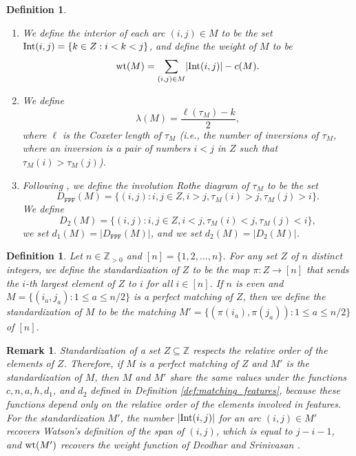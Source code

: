 \documentclass[10pt,a4paper]{amsart}
\newtheorem{defn}[theorem]{Definition}
\newtheorem{rmk}[theorem]{Remark}
\numberwithin{equation}{section}
\newcommand{\Z}{{\mathbb Z}}
\newcommand{\ra}{\rightarrow}
\DeclareMathOperator{\wt}{\rm{wt}}
\DeclareMathOperator{\interior}{\rm{Int}}
\newcommand{\se}{\subseteq}
\newcommand{\abs}[1]{\lvert #1 \rvert}
\begin{document}
\begin{defn}
\begin{enumerate}
\item We define the \emph{interior} of each arc $(i,j)\in M$ to be the set 
  $\interior(i,j)=\{k\in Z: i<k<j\}$, and define the \emph{weight} of $M$ to be
  \begin{equation} \label{eq:wt} 
    \wt(M)=\sum_{(i,j)\in M} \abs{\interior(i,j)}-c(M).
  \end{equation}

\item We define 
  \[
    \lambda(M)=\frac{\ell(\tau_M)-k}{2},
  \]
  where $\ell$ is the Coxeter length of $\tau_M$ (i.e., the number of inversions
  of $\tau_M$, where an inversion is a pair of numbers $i<j$ in $Z$ such that
  $\tau_M(i)>\tau_M(j)$). 
  

\item Following \cite{hamaker18}, we define
  the \emph{involution Rothe diagram} of $\tau_M$ to be
  the set
  \[
    D_\texttt{FPF}(M)=\{(i,j) : i,j\in Z, i>j, \tau_M(i)>j, \tau_M(j)>i\}.
  \]
  We define 
  \[ 
  D_2(M)=\{(i,j) : i,j\in Z, i<j, \tau_M(i)<j, \tau_M(j)<i\},
  \]
  we set $d_1(M)=\abs{D_\texttt{FPF}(M)}$, and we set $d_2(M)=\abs{D_2(M)}$.
\end{enumerate}
\end{defn}


\begin{defn}
\label{defn:standardize}
Let $n\in \Z_{>0}$ and $[n]=\{1,2,\dots ,n\}$. For any set $Z$ of $n$ distinct
integers, we define the \emph{standardization of $Z$} to be the map $\pi: Z\ra
[n]$ that sends the $i$-th largest element of $Z$ to $i$ for all $i\in [n]$. If
$n$ is even and $M=\{(i_a,j_a): 1\le a\le n/2\}$ is a perfect matching of $Z$,
then we define the \emph{standardization of $M$} to be the matching
$M'=\{(\pi(i_a),\pi(j_a)):1\le a\le n/2\}$ of $[n]$. \end{defn}

\begin{rmk}
\label{rmk:standardize}
Standardization of a set $Z\se \Z$ respects the relative order of 
the elements of $Z$. Therefore, if $M$ 
is a perfect matching of $Z$ and 
$M'$ is the standardization of $M$, then $M$ and $M'$ share the
same values under the functions $c,n,a,h, d_1$, and $d_2$ defined in Definition
\ref{def:matching_features}, because these functions depend only on the relative order of the elements involved in features. For
the standardization $M'$, the number $\abs{\interior(i,j)}$ for an arc $(i,j)\in
M'$ recovers Watson's definition of the \emph{span} of $(i,j)$, which is equal
to $j-i-1$, and $\wt(M')$ recovers the \emph{weight} function of Deodhar and
Srinivasan \cite{deodhar}. 
\end{rmk}
\end{document}
